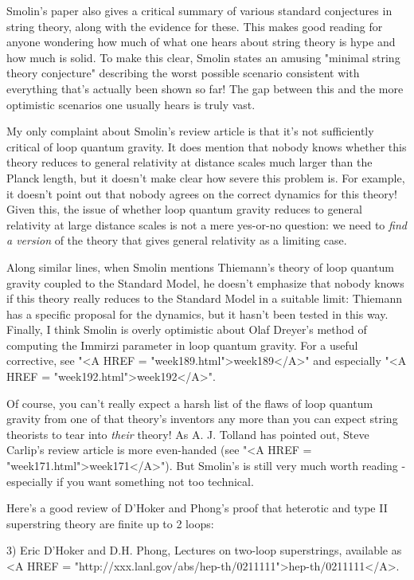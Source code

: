 Smolin's paper also gives a critical summary of various standard
conjectures in string theory, along with the evidence for these.  This
makes good reading for anyone wondering how much of what one hears
about string theory is hype and how much is solid.  To make this
clear, Smolin states an amusing "minimal string theory
conjecture" describing the worst possible scenario consistent
with everything that's actually been shown so far!  The gap between
this and the more optimistic scenarios one usually hears is truly
vast.

My only complaint about Smolin's review article is that it's not 
sufficiently critical of loop quantum gravity.  It does mention 
that nobody knows whether this theory reduces to general relativity 
at distance scales much larger than the Planck length, but it doesn't 
make clear how severe this problem is.  For example, it doesn't point
out that nobody agrees on the correct dynamics for this theory!  Given 
this, the issue of whether loop quantum gravity reduces to general 
relativity at large distance scales is not a mere yes-or-no question: 
we need to \emph{find a version} of the theory that gives general relativity 
as a limiting case.  


Along similar lines, when Smolin mentions Thiemann's theory of loop
quantum gravity coupled to the Standard Model, he doesn't emphasize
that nobody knows if this theory really reduces to the Standard Model
in a suitable limit: Thiemann has a specific proposal for the
dynamics, but it hasn't been tested in this way.  Finally, I think
Smolin is overly optimistic about Olaf Dreyer's method of computing
the Immirzi parameter in loop quantum gravity.  For a useful
corrective, see "<A HREF = "week189.html">week189</A>" and
especially "<A HREF = "week192.html">week192</A>".


Of course, you can't really expect a harsh list of the flaws of loop
quantum gravity from one of that theory's inventors any more than you
can expect string theorists to tear into \emph{their} theory!  As
A. J. Tolland has pointed out, Steve Carlip's review article is more
even-handed (see "<A HREF = "week171.html">week171</A>").
But Smolin's is still very much worth reading - especially if you want
something not too technical.

Here's a good review of D'Hoker and Phong's proof that heterotic
and type II superstring theory are finite up to 2 loops:


3) Eric D'Hoker and D.H. Phong, Lectures on two-loop superstrings,
available as <A HREF =
"http://xxx.lanl.gov/abs/hep-th/0211111">hep-th/0211111</A>.

